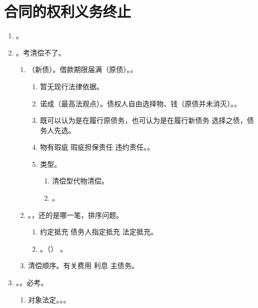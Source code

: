 \section{合同的权利义务终止}
\begin{enumerate}
  \item {}。
  \item {}。考清偿不了。
        \begin{enumerate}
          \item {}（新债）。借款期限届满（原债）。。
                \begin{enumerate}
                  \item 暂无现行法律依据。
                  \item 诺成（最高法观点）。债权人自由选择物、钱（原债并未消灭）。。
                  \item 既可以认为是在履行原债务，也可认为是在履行新债务 \yjt 选择之债，债务人先选。
                  \item 物有瑕疵 \yjt 瑕疵担保责任 \yjt 违约责任。。
                  \item 类型。
                        \begin{enumerate}
                          \item 清偿型代物清偿。
                          \item {}。
                        \end{enumerate}
                \end{enumerate}
          \item {}。，还的是哪一笔，排序问题。
                \begin{enumerate}
                  \item 约定抵充 \dy 债务人指定抵充 \dy 法定抵充。
                  \item {}。（） 。
                \end{enumerate}
          \item 清偿顺序。有关费用 \dy 利息 \dy 主债务。
        \end{enumerate}
  \item {}。。必考。
        \begin{enumerate}
          \item 对象法定。。。

\end{enumerate}
\end{enumerate}
